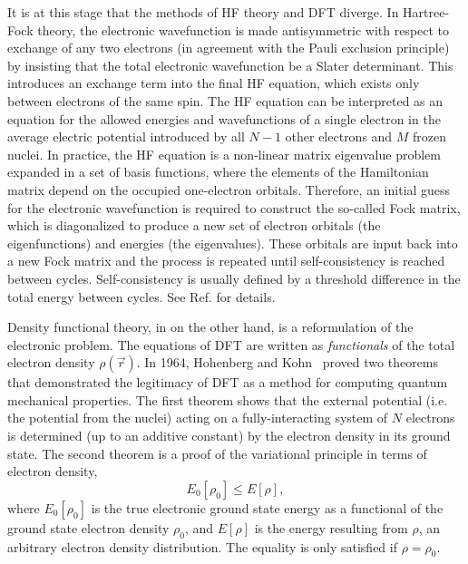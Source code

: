 \documentclass[titlepage,11pt]{article}
\begin{document}
It is at this stage that the methods of HF theory and DFT diverge. In Hartree-Fock theory, the electronic wavefunction is made antisymmetric with respect to exchange of any two electrons (in agreement with the Pauli exclusion principle) by insisting that the total electronic wavefunction be a Slater determinant. This introduces an exchange term into the final HF equation, which exists only between electrons of the same spin. The HF equation can be interpreted as an equation for the allowed energies and wavefunctions of a single electron in the average electric potential introduced by all $N-1$ other electrons and $M$ frozen nuclei. In practice, the HF equation is a non-linear matrix eigenvalue problem expanded in a set of basis functions, where the elements of the Hamiltonian matrix depend on the occupied one-electron orbitals. Therefore, an initial guess for the electronic wavefunction is required to construct the so-called Fock matrix, which is diagonalized to produce a new set of electron orbitals (the eigenfunctions) and energies (the eigenvalues). These orbitals are input back into a new Fock matrix and the process is repeated until self-consistency is reached between cycles. Self-consistency is usually defined by a threshold difference in the total energy between cycles. See Ref.  for details.

Density functional theory, in on the other hand, is a reformulation of the electronic problem. The equations of DFT are written as \textit{functionals} of the total electron density $\rho (\vec{r})$. In 1964, Hohenberg and Kohn~\cite{hohenberg1964inhomogeneous} proved two theorems that demonstrated the legitimacy of DFT as a method for computing quantum mechanical properties. The first theorem shows that the external potential (i.e. the potential from the nuclei) acting on a fully-interacting system of $N$ electrons is determined (up to an additive constant) by the electron density in its ground state. The second theorem is a proof of the variational principle in terms of electron density,
\begin{equation}
	E _ {  0 } \left[ \rho _ { 0 } \right] \leq E [ \rho ],
\end{equation}
where $E _ {  0 } \left[ \rho _ { 0 } \right]$ is the true electronic ground state energy as a functional of the ground state electron density $\rho _ { 0 }$, and $E [ \rho ]$ is the energy resulting from $\rho$, an arbitrary electron density distribution. The equality is only satisfied if $\rho = \rho _ { 0 }$.
\end{document}
